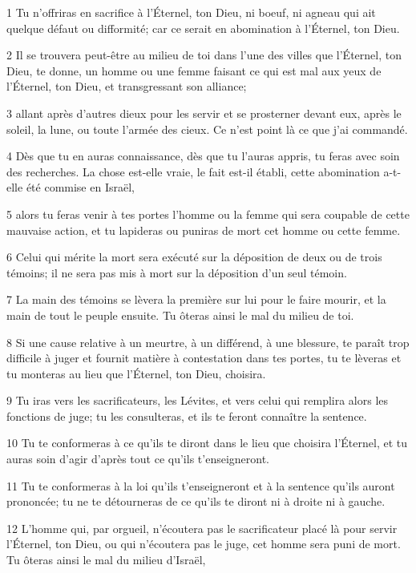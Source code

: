 \par 1 Tu n'offriras en sacrifice à l'Éternel, ton Dieu, ni boeuf, ni agneau qui ait quelque défaut ou difformité; car ce serait en abomination à l'Éternel, ton Dieu.
\par 2 Il se trouvera peut-être au milieu de toi dans l'une des villes que l'Éternel, ton Dieu, te donne, un homme ou une femme faisant ce qui est mal aux yeux de l'Éternel, ton Dieu, et transgressant son alliance;
\par 3 allant après d'autres dieux pour les servir et se prosterner devant eux, après le soleil, la lune, ou toute l'armée des cieux. Ce n'est point là ce que j'ai commandé.
\par 4 Dès que tu en auras connaissance, dès que tu l'auras appris, tu feras avec soin des recherches. La chose est-elle vraie, le fait est-il établi, cette abomination a-t-elle été commise en Israël,
\par 5 alors tu feras venir à tes portes l'homme ou la femme qui sera coupable de cette mauvaise action, et tu lapideras ou puniras de mort cet homme ou cette femme.
\par 6 Celui qui mérite la mort sera exécuté sur la déposition de deux ou de trois témoins; il ne sera pas mis à mort sur la déposition d'un seul témoin.
\par 7 La main des témoins se lèvera la première sur lui pour le faire mourir, et la main de tout le peuple ensuite. Tu ôteras ainsi le mal du milieu de toi.
\par 8 Si une cause relative à un meurtre, à un différend, à une blessure, te paraît trop difficile à juger et fournit matière à contestation dans tes portes, tu te lèveras et tu monteras au lieu que l'Éternel, ton Dieu, choisira.
\par 9 Tu iras vers les sacrificateurs, les Lévites, et vers celui qui remplira alors les fonctions de juge; tu les consulteras, et ils te feront connaître la sentence.
\par 10 Tu te conformeras à ce qu'ils te diront dans le lieu que choisira l'Éternel, et tu auras soin d'agir d'après tout ce qu'ils t'enseigneront.
\par 11 Tu te conformeras à la loi qu'ils t'enseigneront et à la sentence qu'ils auront prononcée; tu ne te détourneras de ce qu'ils te diront ni à droite ni à gauche.
\par 12 L'homme qui, par orgueil, n'écoutera pas le sacrificateur placé là pour servir l'Éternel, ton Dieu, ou qui n'écoutera pas le juge, cet homme sera puni de mort. Tu ôteras ainsi le mal du milieu d'Israël,

